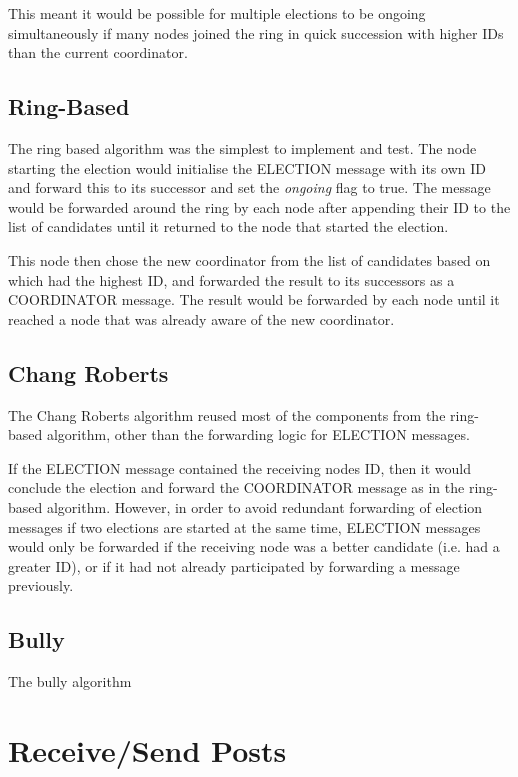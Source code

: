 \documentclass[12pt]{article}
\begin{document}
This meant it would be possible for multiple elections to be ongoing simultaneously if many nodes joined the ring in quick succession with higher IDs than the current coordinator. 

\subsection{Ring-Based}

The ring based algorithm was the simplest to implement and test. The node starting the election would initialise the ELECTION message with its own ID and forward this to its successor and set the \emph{ongoing} flag to true. The message would be forwarded around the ring by each node after appending their ID to the list of candidates until it returned to the node that started the election. 

This node then chose the new coordinator from the list of candidates based on which had the highest ID, and forwarded the result to its successors as a COORDINATOR message. The result would be forwarded by each node until it reached a node that was already aware of the new coordinator.

\subsection{Chang Roberts}

The Chang Roberts algorithm reused most of the components from the ring-based algorithm, other than the forwarding logic for ELECTION messages. 

If the ELECTION message contained the receiving nodes ID, then it would conclude the election and forward the COORDINATOR message as in the ring-based algorithm. However, in order to avoid redundant forwarding of election messages if two elections are started at the same time, ELECTION messages would only be forwarded if the receiving node was a better candidate (i.e. had a greater ID), or if it had not already participated by forwarding a message previously.

\subsection{Bully}

The bully algorithm 

\section{Receive/Send Posts}



\end{document}
